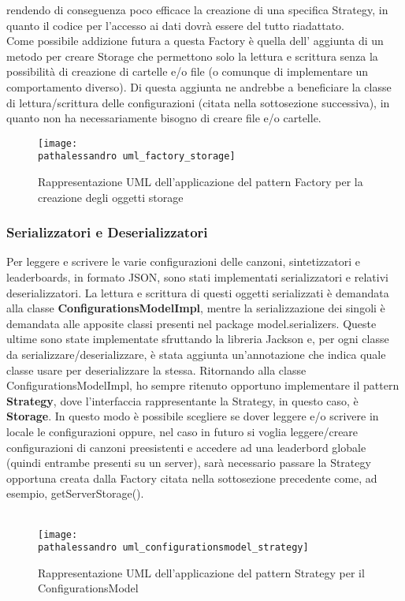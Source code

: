 \documentclass[a4paper,12pt]{report}
\newcommand\pathalessandro{img/alessandro/}
\begin{document}
rendendo di conseguenza poco efficace la creazione di una specifica Strategy, in quanto il codice per l'accesso ai dati dovrà
essere del tutto riadattato. \\
Come possibile addizione futura a questa Factory è quella dell' aggiunta di un metodo per creare Storage che permettono solo la lettura e scrittura
senza la possibilità di creazione di cartelle e/o file (o comunque di implementare un comportamento diverso). Di questa aggiunta ne andrebbe a 
beneficiare la classe di lettura/scrittura delle configurazioni (citata nella sottosezione successiva), in quanto non ha necessariamente bisogno 
di creare file e/o cartelle.
\begin{figure}[!htb]
	\centerline{\texttt{[image: \\pathalessandro uml\_factory\_storage]}}
	\caption{Rappresentazione UML dell'applicazione del pattern Factory per la creazione degli oggetti storage}
	\label{img:uml_factory_storage}
\end{figure}
\clearpage
\subsubsection{Serializzatori e Deserializzatori}
Per leggere e scrivere le varie configurazioni delle canzoni, sintetizzatori e leaderboards, in formato JSON, 
sono stati implementati serializzatori e relativi deserializzatori. La lettura e scrittura di questi oggetti 
serializzati è demandata alla classe \textbf{ConfigurationsModelImpl}, mentre la serializzazione dei singoli è demandata alle apposite classi presenti
nel package model.serializers. Queste ultime sono state implementate sfruttando la libreria Jackson e, per ogni classe da serializzare/deserializzare, è stata aggiunta un'annotazione che indica
quale classe usare per deserializzare la stessa.
Ritornando alla classe ConfigurationsModelImpl, ho sempre ritenuto opportuno implementare il pattern \textbf{Strategy}, dove l'interfaccia rappresentante
la Strategy, in questo caso, è \textbf{Storage}.
In questo modo è possibile scegliere se dover leggere e/o scrivere in locale le configurazioni oppure, nel caso in futuro si voglia leggere/creare
configurazioni di canzoni preesistenti e accedere ad una leaderbord globale (quindi entrambe presenti su un server), sarà necessario passare la Strategy
opportuna creata dalla Factory citata nella sottosezione precedente come, ad esempio, getServerStorage(). \\ \\
\begin{figure}[!htb]
	\centerline{\texttt{[image: \\pathalessandro uml\_configurationsmodel\_strategy]}}
	\caption{Rappresentazione UML dell'applicazione del pattern Strategy per il ConfigurationsModel}
	\label{img:uml_configurationsmodel_strategy}
\end{figure}
\clearpage \hfill\break
\end{document}
